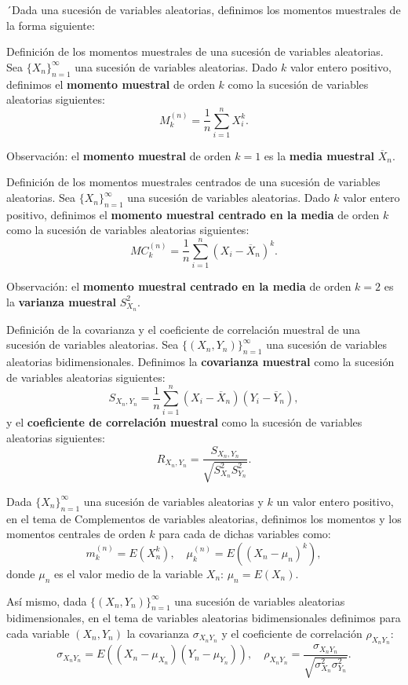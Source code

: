 \documentclass[]{book}
\begin{document}
´Dada una sucesión de variables aleatorias, definimos los momentos muestrales de la forma siguiente:

 Definición de los momentos muestrales de una sucesión de variables aleatorias.
Sea \(\{X_n\}_{n=1}^\infty\) una sucesión de variables aleatorias. Dado \(k\) valor entero positivo, definimos el \textbf{momento muestral} de orden \(k\) como la sucesión de variables aleatorias siguientes:
\[
M_k^{(n)} = \frac{1}{n}\sum_{i=1}^n X_i^k.
\]

 Observación:
el \textbf{momento muestral} de orden \(k=1\) es la \textbf{media muestral} \(\overline{X}_n\).

 Definición de los momentos muestrales centrados de una sucesión de variables aleatorias.
Sea \(\{X_n\}_{n=1}^\infty\) una sucesión de variables aleatorias. Dado \(k\) valor entero positivo, definimos el \textbf{momento muestral centrado en la media} de orden \(k\) como la sucesión de variables aleatorias siguientes:
\[
MC_k^{(n)} = \frac{1}{n}\sum_{i=1}^n (X_i-\overline{X}_n)^k.
\]

 Observación:
el \textbf{momento muestral centrado en la media} de orden \(k=2\) es la \textbf{varianza muestral} \(S_{X_n}^2\).

 Definición de la covarianza y el coeficiente de correlación muestral de una sucesión de variables aleatorias.
Sea \(\{(X_n,Y_n)\}_{n=1}^\infty\) una sucesión de variables aleatorias bidimensionales. Definimos la \textbf{covarianza muestral} como la sucesión de variables aleatorias siguientes:
\[
S_{X_n,Y_n} = \frac{1}{n}\sum_{i=1}^n (X_i-\overline{X}_n)(Y_i-\overline{Y}_n),
\]
y el \textbf{coeficiente de correlación muestral} como la sucesión de variables aleatorias siguientes:
\[
R_{X_n,Y_n}=\frac{S_{X_n,Y_n}}{\sqrt{S_{X_n}^2 S_{Y_n}^2}}.
\]

Dada \(\{X_n\}_{n=1}^\infty\) una sucesión de variables aleatorias y \(k\) un valor entero positivo, en el tema de Complementos de variables aleatorias, definimos los momentos y los momentos centrales de orden \(k\) para cada de dichas variables como:
\[
m_k^{(n)} = E\left(X_n^k\right),\quad\mu_k^{(n)}=E\left(\left(X_n-\mu_n\right)^k\right),
\]
donde \(\mu_n\) es el valor medio de la variable \(X_n\): \(\mu_n = E(X_n)\).

Así mismo, dada \(\{(X_n,Y_n)\}_{n=1}^\infty\) una sucesión de variables aleatorias bidimensionales, en el tema de variables aleatorias bidimensionales definimos para cada variable \((X_n,Y_n)\) la covarianza \(\sigma_{X_nY_n}\) y el coeficiente de correlación \(\rho_{X_nY_n}\):
\[
\sigma_{X_nY_n}=E((X_n-\mu_{X_n})(Y_n-\mu_{Y_n})),\quad \rho_{X_nY_n}=\frac{\sigma_{X_nY_n}}{\sqrt{\sigma_{X_n}^2\sigma_{Y_n}^2}}.
\]
\end{document}

